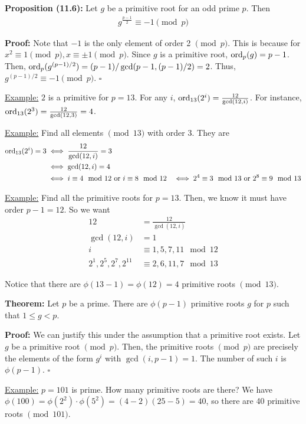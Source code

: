 \documentclass{article}
\newcommand*{\qed}{\hfill$\square$}%
\begin{document}
\textbf{Proposition (11.6):} Let $g$ be a primitive root for an odd prime $p$. Then \begin{align*}
    g^{\frac{p-1}{2}}\equiv -1\pmod p
\end{align*}

\textbf{Proof:} Note that $-1$ is the only element of order 2 $\pmod p$. This is because for $x^2\equiv 1\pmod p, x\equiv \pm 1\pmod p$. Since $g$ is a primitive root, $\text{ord}_p(g) = p-1$. Then, $\text{ord}_p(g^{(p-1)/2})=(p-1)/\gcd(p-1,(p-1)/2)=2$. Thus, $g^{(p-1)/2}\equiv -1\pmod p$. \qed

\underline{Example:} $2$ is a primitive for $p=13$. For any $i$, $\text{ord}_{13}(2^i)=\frac{12}{\gcd(12,i)}$. For instance, $\text{ord}_{13}(2^3)=\frac{12}{\gcd(12,3)}=4$.

\underline{Example:} Find all elements $\pmod{13}$ with order $3$. They are \begin{align*}
    \text{ord}_{13}(2^i)=3&\iff \frac{12}{\gcd(12,i)}=3\\
    &\iff \gcd(12,i)=4\\
    &\iff i\equiv 4\mod{12}\text{ or }i\equiv 8\mod{12}
    &\iff 2^4\equiv 3\mod{13}\text{ or }2^8\equiv 9\mod{13}
\end{align*}

\underline{Example:} Find all the primitive roots for $p=13$. Then, we know it must have order $p-1=12$. So we want \begin{align*}
    12&=\frac{12}{\gcd(12,i)}\\
    \gcd(12,i)&=1\\
    i&\equiv 1,5,7,11\mod{12}\\
    2^1, 2^5, 2^7, 2^{11}&\equiv 2,6,11,7\mod{13}
\end{align*}

Notice that there are $\phi(13-1)=\phi(12)=4$ primitive roots $\pmod{13}$.

\textbf{Theorem:} Let $p$ be a prime. There are $\phi(p-1)$ primitive roots $g$ for $p$ such that $1\leq g<p$. 

\textbf{Proof:} We can justify this under the assumption that a primitive root exists. Let $g$ be a primitive root $\pmod p$. Then, the primitive roots $\pmod p$ are precisely the elements of the form $g^i$ with $\gcd(i,p-1)=1$. The number of such $i$ is $\phi(p-1)$. \qed

\underline{Example:} $p=101$ is prime. How many primitive roots are there? We have $\phi(100)=\phi(2^2)\cdot \phi(5^2)=(4-2)(25-5)=40$, so there are 40 primitive roots $\pmod{101}$.
\end{document}
